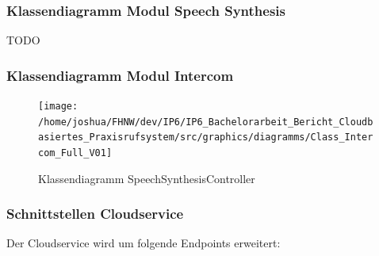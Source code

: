 \clearpage
\subsubsection{Klassendiagramm Modul Speech Synthesis}
TODO
\clearpage

\subsubsection{Klassendiagramm Modul Intercom}
\begin{figure}[h]
    \centering
    \begin{minipage}[b]{1\textwidth}
        \texttt{[image: /home/joshua/FHNW/dev/IP6/IP6\_Bachelorarbeit\_Bericht\_Cloudbasiertes\_Praxisrufsystem/src/graphics/diagramms/Class\_Intercom\_Full\_V01]}
        \caption{Klassendiagramm SpeechSynthesisController}
    \end{minipage}
\end{figure}

\clearpage

\subsubsection{Schnittstellen Cloudservice}

Der Cloudservice wird um folgende Endpoints erweitert:

